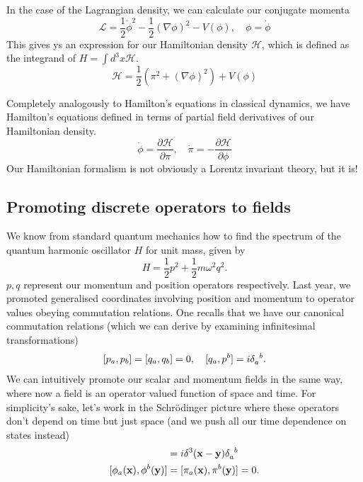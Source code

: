 \documentclass[11pt, oneside]{article}   	%
\theoremstyle{newline}
\theoremstyle{newline}
\theoremstyle{newline}
\theoremstyle{newline}
\theoremstyle{newline}
\begin{document}
In the case of the Lagrangian density, we can calculate our conjugate momenta 
\[ 
\mathcal{L}  = \frac{ 1} {2} \dot{\phi}^2  - \frac{1}{ 2} (\nabla \phi)^2  - V( \phi ), \quad \phi  = \dot{\phi} 
\] 
This gives ys an expression for our Hamiltonian density $\mathcal{H}$, which is defined as the integrand of $H = \int d^3 x \mathcal{H} $. 
\[ 
\mathcal{H} = \frac{1}{ 2} ( \pi^ 2 + ( \nabla \phi)^ 2 ) + V(\phi ) 
\] 

Completely analogously to Hamilton's equations in classical dynamics, we have Hamilton's equations defined in terms of partial field derivatives of our Hamiltonian density. 
\[ 
\dot{\phi} = \frac{ \partial  \mathcal{H}}{ \partial \pi }, \quad \dot{\pi} =  - \frac{ \partial \mathcal{H}}{ \partial \phi} 
\] Our Hamiltonian formalism is not obviously a Lorentz invariant theory, but it is!

\subsection{Promoting discrete operators to fields}
We know from standard quantum mechanics how to find the spectrum of the quantum harmonic oscillator $H$ for unit mass, given by 
\[
H  = \frac{1}{2}  p^2 + \frac{1}{2} m \omega^2 q^2. 
\]
$p, q$ represent our momentum and position operators respectively. Last year, we promoted generalised coordinates involving position and momentum to operator values obeying commutation relations. One recalls that we have our canonical commutation relations (which we can derive by examining infinitesimal transformations)
\[ 
[p_a, p_b] = [q_a, q_b] = 0, \quad [q_a, p^b] = i \delta \indices{_a^b}. 
\] 
We can intuitively promote our scalar and momentum fields in the same way, where now a field is an operator valued function of space and time. For simplicity's sake, let's work in the Schrödinger picture where these operators don't depend on time but just space (and we push all our time dependence on states instead)
\begin{align*}
[\phi_a(\mathbf{x}), \pi^b(\mathbf{y})] & = i \delta^3 (\mathbf{x} - \mathbf{y}) \delta\indices{_a^b} \\ 
[\phi_a(\mathbf{x}), \phi^b(\mathbf{y})] &= [\pi_a(\mathbf{x}), \pi^b ( \mathbf{y} ) ] = 0. 
\end{align*}
\end{document}

